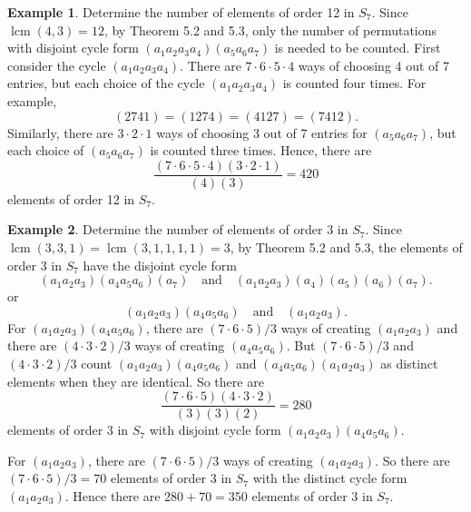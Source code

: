 \documentclass{article}
\DeclareMathOperator{\lcm}{lcm}
\theoremstyle{definition}
\newtheorem{example}{Example}[section]
\begin{document}
 \begin{example}
    Determine the number of elements of order 12 in $S_7$. Since $\lcm(4,3)=12$, by Theorem 5.2 and 5.3, only the number of permutations with disjoint cycle form $(a_1a_2a_3a_4)(a_5a_6a_7)$ is needed to be counted. First consider the cycle $(a_1a_2a_3a_4)$. There are $7\cdot6\cdot5\cdot4$ ways of choosing 4 out of 7 entries, but each choice of the cycle $(a_1a_2a_3a_4)$ is counted four times. For example, 
    \begin{equation*}
        (2741) = (1274) = (4127) = (7412).
    \end{equation*}
    Similarly, there are $3\cdot2\cdot1$ ways of choosing 3 out of 7 entries for $(a_5a_6a_7)$, but each choice of $(a_5a_6a_7)$ is counted three times. Hence, there are
    \begin{equation*}
        \frac{(7\cdot6\cdot5\cdot4)(3\cdot2\cdot1)}{(4)(3)} = 420
    \end{equation*}
    elements of order 12 in $S_7$.
 \end{example}
 
 \begin{example}
    Determine the number of elements of order 3 in $S_7$. Since $\lcm(3,3,1) = \lcm(3,1,1,1,1) = 3$, by Theorem 5.2 and 5.3, the elements of order 3 in $S_7$ have the disjoint cycle form
    \begin{equation*}
        (a_1a_2a_3)(a_4a_5a_6)(a_7) \quad \text{and} \quad (a_1a_2a_3)(a_4)(a_5)(a_6)(a_7).
    \end{equation*}
    or
    \begin{equation*}
        (a_1a_2a_3)(a_4a_5a_6) \quad \text{and} \quad (a_1a_2a_3).
    \end{equation*}
    For $(a_1a_2a_3)(a_4a_5a_6)$, there are $(7\cdot6\cdot5)/3$ ways of creating $(a_1a_2a_3)$ and there are $(4\cdot3\cdot2)/3$ ways of creating $(a_4a_5a_6)$. But $(7\cdot6\cdot5)/3$ and $(4\cdot3\cdot2)/3$ count $(a_1a_2a_3)(a_4a_5a_6)$ and $(a_4a_5a_6)(a_1a_2a_3)$ as distinct elements when they are identical. So there are
    \begin{equation*}
        \frac{(7\cdot6\cdot5)(4\cdot3\cdot2)}{(3)(3)(2)} = 280
    \end{equation*} elements of order 3 in $S_7$ with disjoint cycle form $(a_1a_2a_3)(a_4a_5a_6)$.
    
    For $(a_1a_2a_3)$, there are $(7\cdot6\cdot5)/3$ ways of creating $(a_1a_2a_3)$. So there are $(7\cdot6\cdot5)/3=70$ elements of order 3 in $S_7$ with the distinct cycle form $(a_1a_2a_3)$. Hence there are $280+70=350$ elements of order 3 in $S_7$.
 \end{example}
 
\end{document}
